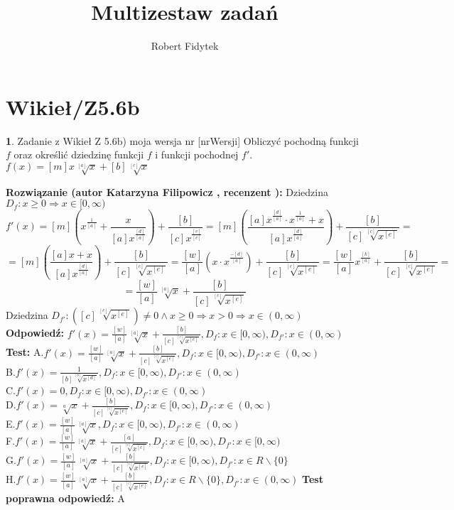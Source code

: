 \documentclass[12pt, a4paper]{article}
\title{Multizestaw zadań}
\author{Robert Fidytek}
\date{}
\theoremstyle{definition} %
\newtheorem{zad}{}
\newcommand{\kategoria}[1]{\section{#1}} %
\newcommand{\zadStart}[1]{\begin{zad}#1\newline} %
\newcommand{\zadStop}{\end{zad}}   %
\newcommand{\rozwStart}[2]{\noindent \textbf{Rozwiązanie (autor #1 , recenzent #2): }\newline} %
\newcommand{\rozwStop}{\newline}                                            %
\newcommand{\odpStart}{\noindent \textbf{Odpowiedź:}\newline}    %
\newcommand{\odpStop}{\newline}                                             %
\newcommand{\testStart}{\noindent \textbf{Test:}\newline} %
\newcommand{\testStop}{\newline} %
\newcommand{\kluczStart}{\noindent \textbf{Test poprawna odpowiedź:}\newline} %
\newcommand{\kluczStop}{\newline} %
\begin{document}
\maketitle


\kategoria{Wikieł/Z5.6b}
\zadStart{Zadanie z Wikieł Z 5.6b) moja wersja nr [nrWersji]}
Obliczyć pochodną funkcji $f$ oraz określić dziedzinę funkcji $f$ i funkcji pochodnej $f'$.\\
$f(x)=[m]x\sqrt[[a]]{x}+[b]\sqrt[[c]]{x}$
\zadStop
\rozwStart{Katarzyna Filipowicz}{}
Dziedzina $D_f: x \geq 0 \Rightarrow x \in [0,\infty)$
$$
f'(x)=[m]\left(x^{\frac{1}{[a]}}+\frac{x}{[a]x^{\frac{[d]}{[a]}}}\right)+\frac{[b]}{[c]x^{\frac{[e]}{[c]}}}=[m]\left(\frac{[a]x^{\frac{[d]}{[a]}}\cdot x^{\frac{1}{[a]}}+x}{[a]x^{\frac{[d]}{[a]}}}\right)+\frac{[b]}{[c] \sqrt[[c]]{x^{[e]}}}=
$$ $$
=[m]\left(\frac{[a]x+x}{[a]x^{\frac{[d]}{[a]}}}\right)+\frac{[b]}{[c] \sqrt[[c]]{x^{[e]}}}
=\frac{[w]}{[a]}\left(x \cdot x^{\frac{-[d]}{[a]}}\right)+\frac{[b]}{[c] \sqrt[[c]]{x^{[e]}}}=
\frac{[w]}{[a]} x^{\frac{[k]}{[a]}}+\frac{[b]}{[c] \sqrt[[c]]{x^{[e]}}}=
$$  $$
=\frac{[w]}{[a]} \sqrt[[a]]{x}+\frac{[b]}{[c] \sqrt[[c]]{x^{[e]}}}
$$
Dziedzina $D_{f'}: ([c] \sqrt[[c]]{x^{[e]}}) \neq 0 \wedge x\geq 0 \Rightarrow x > 0 \Rightarrow   x \in (0,\infty)$
\rozwStop
\odpStart
$f'(x)=\frac{[w]}{[a]} \sqrt[[a]]{x}+\frac{[b]}{[c] \sqrt[[c]]{x^{[e]}}}, D_{f}:x \in [0,\infty), D_{f'}:x \in (0,\infty)$
\odpStop
\testStart
A.$f'(x)=\frac{[w]}{[a]} \sqrt[[a]]{x}+\frac{[b]}{[c] \sqrt[[c]]{x^{[e]}}}, D_{f}:x \in [0,\infty), D_{f'}:x \in (0,\infty)$\\
B.$f'(x)=\frac{1}{[b] \sqrt[[b]]{x^{[d]}}}, D_{f}:x \in [0,\infty), D_{f'}:x \in (0,\infty)$\\
C.$f'(x)=0, D_{f}:x \in [0,\infty), D_{f'}:x \in (0,\infty)$\\
D.$f'(x)= \sqrt[a]{x}+\frac{[b]}{[c] \sqrt[[c]]{x^{[e]}}}, D_{f}:x \in [0,\infty), D_{f'}:x \in (0,\infty)$\\
E.$f'(x)=\frac{[w]}{[a]} \sqrt[[a]]{x}, D_{f}:x \in [0,\infty), D_{f'}:x \in (0,\infty)$\\
F.$f'(x)=\frac{[w]}{[a]} \sqrt[[a]]{x}+\frac{[a]}{[c] \sqrt[[c]]{x^{[c]}}}, D_{f}:x \in [0,\infty), D_{f'}:x \in [0,\infty)$\\
G.$f'(x)=\frac{[w]}{[a]} \sqrt[[a]]{x}+\frac{[b]}{[c] \sqrt[[c]]{x^{[e]}}}, D_{f}:x \in [0,\infty), D_{f'}:x \in R\backslash \{0\}$\\
H.$f'(x)=\frac{[w]}{[a]} \sqrt[[a]]{x}+\frac{[b]}{[c] \sqrt[[c]]{x^{[e]}}}, D_{f}:x \in R\backslash \{0\}, D_{f'}:x \in (0,\infty)$
\testStop
\kluczStart
A
\kluczStop
\end{document}
